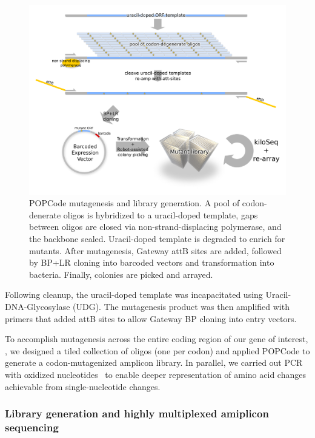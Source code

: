 \begin{figure}[h!]
	\centering
	\includegraphics[width=\textwidth]{img/popcode_schema.pdf}%
	\caption{POPCode mutagenesis and library generation. A pool of codon-denerate oligos is hybridized to a uracil-doped template, gaps between oligos are closed via non-strand-displacing polymerase, and the backbone sealed. Uracil-doped template is degraded to enrich for mutants. After mutagenesis, Gateway attB sites are added, followed by BP+LR cloning into barcoded vectors and transformation into bacteria. Finally, colonies are picked and arrayed.}
	\label{fig:popcode_schema}
\end{figure}
Following cleanup, the uracil-doped template was incapacitated using Uracil-DNA-Glycosylase (UDG). The mutagenesis product was then amplified with primers that added attB sites to allow Gateway BP cloning into entry vectors.

To accomplish mutagenesis across the entire coding region of our gene of interest, , we designed a tiled collection of oligos (one per codon) and applied POPCode to generate a codon-mutagenized amplicon library.  In parallel, we carried out PCR with oxidized nucleotides~\cite{mohan_pcr_2011} to enable deeper representation of amino acid changes achievable from single-nucleotide changes.

\subsubsection{Library generation and highly multiplexed amiplicon sequencing}

